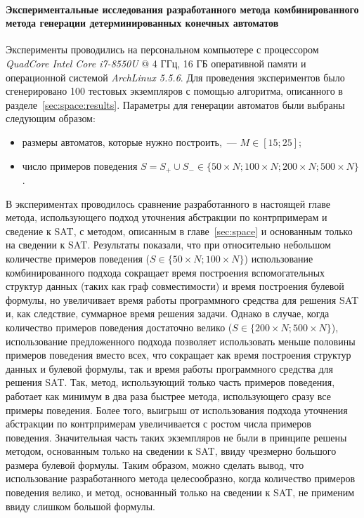 
\paragraph*{Экспериментальные исследования разработанного метода комбинированного метода генерации детерминированных конечных автоматов}
\label{sec:cegar:results:cegar}

Эксперименты проводились на персональном компьютере с процессором \emph{QuadCore Intel Core i7-8550U} @ 4 ГГц, 16 ГБ оперативной памяти и операционной системой \emph{ArchLinux 5.5.6}. Для проведения экспериментов было сгенерировано 100 тестовых экземпляров с помощью алгоритма, описанного в разделе~\ref{sec:space:results}.
Параметры для генерации автоматов были выбраны следующим образом:
\begin{itemize}
  \item размеры автоматов, которые нужно построить,~--- $M \in \left[15; 25\right]$;
  \item число примеров поведения $S = S_{+} \cup S_{-} \in \{50 \times N; 100 \times N; 200 \times N; 500 \times N\}$.
\end{itemize}
В экспериментах проводилось сравнение разработанного в настоящей главе метода, использующего подход уточнения абстракции по контрпримерам и сведение к SAT, с методом, описанным в главе~\ref{sec:space} и основанным только на сведении к SAT.
Результаты показали, что при относительно небольшом количестве примеров поведения ($S \in \{50 \times N; 100 \times N\}$) использование комбинированного подхода сокращает время построения вспомогательных структур данных (таких как граф совместимости) и время построения булевой формулы, но увеличивает время работы программного средства для решения SAT и, как следствие, суммарное время решения задачи.
Однако в случае, когда количество примеров поведения достаточно велико ($S \in \{200 \times N; 500 \times N\}$), использование предложенного подхода позволяет использовать меньше половины примеров поведения вместо всех, что сокращает как время построения структур данных и булевой формулы, так и время работы программного средства для решения SAT.
Так, метод, использующий только часть примеров поведения, работает как минимум в два раза быстрее метода, использующего сразу все примеры поведения.
Более того, выигрыш от использования подхода уточнения абстракции по контрпримерам увеличивается с ростом числа примеров поведения.
Значительная часть таких экземпляров не были в принципе решены методом, основанным только на сведении к SAT, ввиду чрезмерно большого размера булевой формулы.
Таким образом, можно сделать вывод, что использование разработанного метода целесообразно, когда количество примеров поведения велико, и метод, основанный только на сведении к SAT, не применим ввиду слишком большой формулы.

